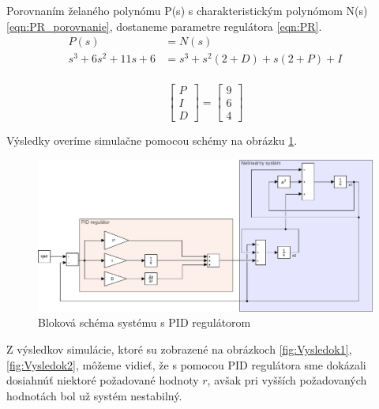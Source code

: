 \documentclass[../main.tex]{subfiles}
\begin{document}
Porovnaním želaného polynómu P(s) s charakteristickým polynómom N(s) \ref{eqn:PR_porovnanie}, dostaneme parametre regulátora \ref{eqn:PR}.
\begin{equation}
	\begin{aligned}
	P(s) &= N(s) \\
	s^3 + 6s^2 + 11s + 6 &= s^3+s^2(2+D)+s(2+P)+I\\
	\end{aligned}
 \label{eqn:PR_porovnanie}
\end{equation}	

 \begin{equation}
\begin{bmatrix}P \\I\\ D \end{bmatrix} = \begin{bmatrix} 9 \\6\\4 \end{bmatrix}
 \label{eqn:PR}
\end{equation}

Výsledky overíme simulačne pomocou schémy na obrázku \ref{fig:PrikladsRiadenimPID}.
	
\begin{figure}[H]
	\begin{center}\includegraphics[scale=0.6]{pid.pdf}\end{center}
	\caption{Bloková schéma systému s PID regulátorom}
	\label{fig:PrikladsRiadenimPID}
\end{figure}

Z výsledkov simulácie, ktoré su zobrazené na obrázkoch \ref{fig:Vysledok1}, \ref{fig:Vysledok2}, môžeme vidieť, že s pomocou PID regulátora sme dokázali dosiahnúť niektoré požadované hodnoty $r$, avšak pri vyšších požadovaných hodnotách bol už systém nestabilný.
\end{document}
